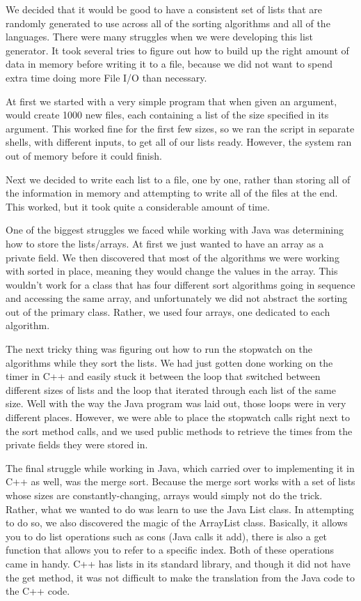 
We decided that it would be good to have a consistent set of lists that are 
randomly generated to use across all of the sorting algorithms and all of the 
languages. There were many struggles when we were developing this list generator.
It took several tries to figure out how to build up the right amount of data in 
memory before writing it to a file, because we did not want to spend extra time 
doing more File I/O than necessary. 

At first we started with a very simple program that when given an argument, would
create 1000 new files, each containing a list of the size specified in its 
argument. This worked fine for the first few sizes, so we ran the script in 
separate shells, with different inputs, to get all of our lists ready. However,
the system ran out of memory before it could finish.

Next we decided to write each list to a file, one by one, rather than storing all 
of the information in memory and attempting to write all of the files at the end. 
This worked, but it took quite a considerable amount of time.

One of the biggest struggles we faced while working with Java was determining how 
to store the lists/arrays. At first we just wanted to have an array as a private 
field. We then discovered that most of the algorithms we were working with sorted 
in place, meaning they would change the values in the array. This wouldn't work 
for a class that has four different sort algorithms going in sequence and
accessing the same array, and unfortunately we did not abstract the sorting out 
of the primary class. Rather, we used four arrays, one dedicated to each 
algorithm.

The next tricky thing was figuring out how to run the stopwatch on the 
algorithms while they sort the lists. We had just gotten done working on the
timer in C++ and easily stuck it between the loop that switched between
different sizes of lists and the loop that iterated through each list of the
same size. Well with the way the Java program was laid out, those loops were in
very different places. However, we were able to place the stopwatch calls right
next to the sort method calls, and we used public methods to retrieve the times
from the private fields they were stored in.

The final struggle while working in Java, which carried over to implementing it
in C++ as well, was the merge sort. Because the merge sort works with a set of
lists whose sizes are constantly-changing, arrays would simply not do the trick.
Rather, what we wanted to do was learn to use the Java List class. In attempting
to do so, we also discovered the magic of the ArrayList class. Basically, it
allows you to do list operations such as cons (Java calls it add), there is also
a get function that allows you to refer to a specific index. Both of these
operations came in handy. C++ has lists in its standard library, and though it
did not have the get method, it was not difficult to make the translation from
the Java code to the C++ code.

